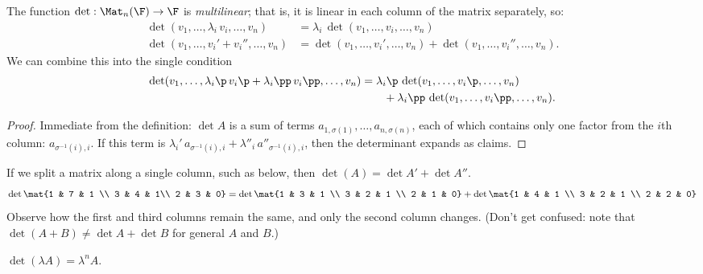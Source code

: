 \begin{proposition}
	The function $\det:\Mat_n(\F) \to \F$ is \emph{multilinear}; that is, it is linear in each column of the matrix separately, so: \label{prop-multilinearity} %
	\begin{align*}
		\det(v_1,\ldots,\lambda_i\,v_i,\ldots,v_n)
		&= \lambda_i\,\det(v_1,\ldots,v_i,\ldots,v_n) \\
		\det(v_1,\ldots,v_i'+v_i'',\ldots,v_n)
		&= \det(v_1,\ldots,v_i',\ldots,v_n)
		 + \det(v_1,\ldots,v_i'',\ldots,v_n).
	\end{align*}
	We can combine this into the single condition
	\begin{align*}
		\det(v_1,\ldots,\lambda_i\p\,v_i\p + \lambda_i\pp\,v_i\pp,\ldots,v_n)
		&= \lambda_i\p\,\det(v_1,\ldots,v_i\p,\ldots,v_n) \\
		&\qquad + \lambda_i\pp \, \det(v_1,\ldots,v_i\pp,\ldots,v_n). %
	\end{align*}
\end{proposition}

\begin{proof}
	Immediate from the definition: $\det A$ is a sum of terms $a_{1,\sigma(1)},\ldots,a_{n,\sigma(n)}$, each of which contains only one factor  from the $i$th column: $a_{\sigma^{-1}(i),i}$. If this term is $\lambda_i'\,a_{\sigma^{-1}(i),i} + \lambda''_i\,a''_{\sigma^{-1}(i),i}$, then the determinant expands as claims. %
\end{proof}

\begin{example}
	If we split a matrix along a single column, such as below, then $\det (A)=\det A' + \det A''$. %
	\begin{equation*}
		  \det\mat{1 & 7 & 1 \\ 3 & 4 & 1\\ 2 & 3 & 0}
		= \det\mat{1 & 3 & 1 \\ 3 & 2 & 1 \\ 2 & 1 & 0}
		+ \det\mat{1 & 4 & 1 \\ 3 & 2 & 1 \\ 2 & 2 & 0}
	\end{equation*}
	Observe how the first and third columns remain the same, and only the second column changes. (Don't get confused: note that  $\det(A+B)\neq \det A + \det B$ for general $A$ and $B$.) %
\end{example}

\begin{corollary}
	$\det(\lambda A)=\lambda^n A$. %
\end{corollary}

